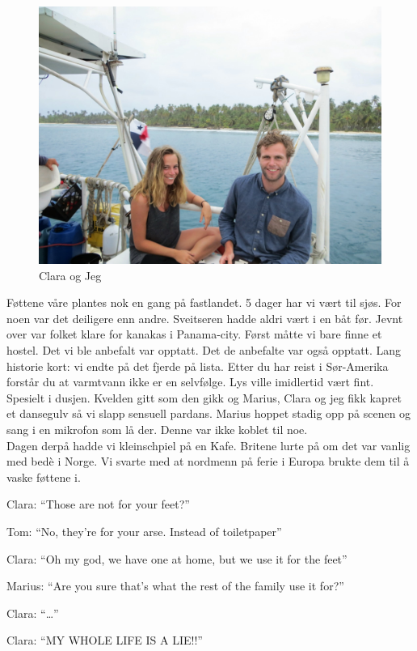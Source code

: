 \begin{figure}[H]
	\centering
	\includegraphics[width=\textwidth]{akselogclara}
	\caption*{Clara og Jeg}
	\label{fig:claraogaksel}
\end{figure}

Føttene våre plantes nok en gang på fastlandet. 5 dager har vi vært
til sjøs.  For
noen var det deiligere enn andre. Sveitseren hadde aldri vært i en båt
før. Jevnt over var folket klare for kanakas i Panama-city.
Først måtte vi bare finne et hostel. Det vi ble anbefalt var opptatt.
Det de anbefalte var også opptatt. Lang historie kort: vi endte på det
fjerde på lista. Etter du har reist i Sør-Amerika forstår du at
varmtvann ikke er en selvfølge. Lys ville imidlertid vært fint.
Spesielt i dusjen.
Kvelden gitt som den gikk og Marius, Clara og jeg fikk kapret et
dansegulv så vi slapp sensuell pardans. Marius hoppet stadig opp på
scenen og sang i en mikrofon som lå der. Denne var ikke koblet til
noe. \\
Dagen derpå hadde vi kleinschpiel på en Kafe. Britene lurte på om
det var vanlig med bedè i Norge. Vi svarte med at nordmenn på ferie i
Europa brukte dem til å vaske føttene i.

\begin{dialogue}
	\item Clara: ``Those are not for your feet?''
	\item Tom: ``No, they're for your arse. Instead of
		toiletpaper''
	\item Clara: ``Oh my god, we have one at home, but we use it
		for the feet''
	\item Marius: ``Are you sure that's what the rest of the
		family use it for?''
	\item Clara: ``\ldots''
	\item Clara: ``MY WHOLE LIFE IS A LIE!!''
\end{dialogue}



